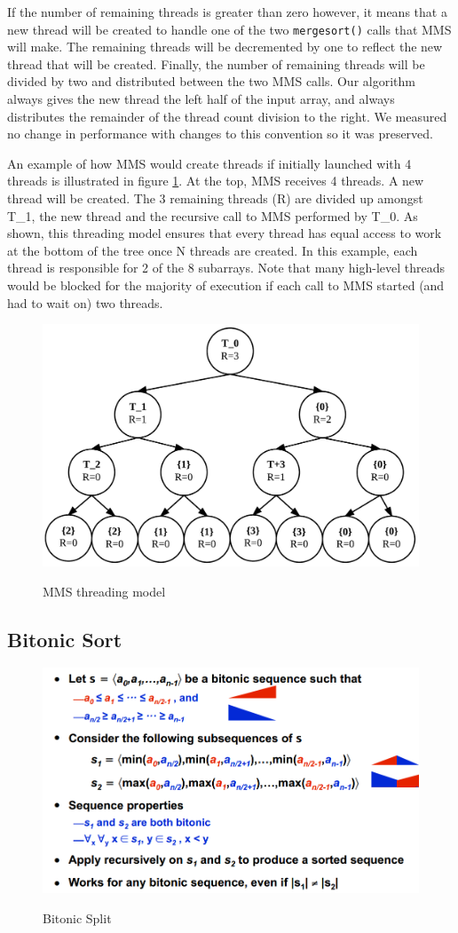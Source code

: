 \documentclass[journal]{IEEEtran}
\begin{document}
If the number of remaining threads is greater than zero however, it means that a new thread will be created to handle one of the two \texttt{mergesort()} calls that MMS will make.  The remaining threads will be decremented by one to reflect the new thread that will be created.  Finally, the number of remaining threads will be divided by two and distributed between the two MMS calls.  Our algorithm always gives the new thread the left half of the input array, and always distributes the remainder of the thread count division to the right.  We measured no change in performance with changes to this convention so it was preserved.  

An example of how MMS would create threads if initially launched with 4 threads is illustrated in figure \ref{mms_thread}.  At the top, MMS receives 4 threads. A new thread will be created.  The 3 remaining threads (R) are divided up amongst T\_1, the new thread and the recursive call to MMS performed by T\_0.  As shown, this threading model ensures that every thread has equal access to work at the bottom of the tree once N threads are created.  In this example, each thread is responsible for 2 of the 8 subarrays.  Note that many high-level threads would be blocked for the majority of execution if each call to MMS started (and had to wait on) two threads.

\begin{figure}[f]
\caption{MMS threading model}
\centering
\includegraphics[width=.5\textwidth]{include/mms.png}
\label{mms_thread}
\end{figure}


\subsection{Bitonic Sort}

	\begin{figure}[t!]
	\caption{Bitonic Split}
  \centering
	\includegraphics[width=.5\textwidth]{bitonic_split.png}
	\label{bitonic_split}
	\end{figure}
	
\end{document}
